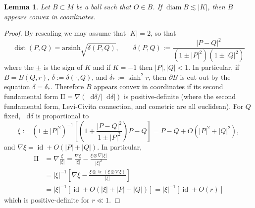 \documentclass[reqno,10pt]{amsart}
\DeclareMathOperator{\diam}{diam}
\DeclareMathOperator{\id}{id}
\newcommand{\tr}{\operatorname{tr}}
\newcommand*\dif{\mathop{}\!\mathrm{d}}
\DeclareMathOperator{\dist}{dist}
\newcommand{\Two}{\mathrm{I\!I}}
\newtheorem{lemma}[theorem]{Lemma}
\theoremstyle{definition}
\numberwithin{equation}{section}
\begin{document}
\begin{lemma}\label{convex balls}
Let $B \subset M$ be a ball such that $O \in B$.
If $\diam B \lesssim |K|$, then $B$ appears convex in coordinates.
\end{lemma}
\begin{proof}
By rescaling we may assume that $|K| = 2$, so that 
$$\dist(P, Q) = \mathrm{arsinh} \sqrt{\delta(P, Q)}, \qquad \delta(P, Q) := \frac{|P - Q|^2}{(1 \pm |P|^2)(1 \pm |Q|^2)}$$
where the $\pm$ is the sign of $K$ and if $K = -1$ then $|P|, |Q| < 1$.
In particular, if $B = B(Q, r)$, $\delta := \delta(\cdot, Q)$, and $\delta_* := \sinh^2 r$, then $\partial B$ is cut out by the equation $\delta = \delta_*$.
Therefore $B$ appears convex in coordinates if its second fundamental form $\Two = \nabla(\dif \delta/|\dif \delta|)$ is positive-definite (where the second fundamental form, Levi-Civita connection, and cometric are all euclidean).
For $Q$ fixed, $\dif \delta$ is proportional to 
$$\xi := (1 \pm |P|^2)^{-1} \left[\left(1 + \frac{|P - Q|^2}{1 \pm |P|^2}\right)P - Q\right] = P - Q + O(|P|^2 + |Q|^2),$$
and $\nabla \xi = \id + O(|P| + |Q|)$.
In particular,
\begin{align*}
\Two &= \nabla\frac{\xi}{|\xi|} = \frac{\nabla \xi}{|\xi|} - \frac{\xi \otimes \nabla|\xi|}{|\xi|^2} \\
&= |\xi|^{-1} \left[\nabla \xi - \frac{\xi \otimes \tr(\xi \otimes \nabla \xi)}{|\xi|}\right] \\
&= |\xi|^{-1} [\id + O(|\xi| + |P| + |Q|)] = |\xi|^{-1} [\id + O(r)]
\end{align*}
which is positive-definite for $r \ll 1$.
\end{proof}

\printbibliography
\end{document}

